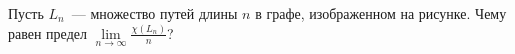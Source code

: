 Пусть $L_n$~--- множество путей длины $n$ в графе, изображенном на рисунке.
Чему равен предел $\lim\limits_{n \to \infty} \frac{\chi(L_n)}{n}$?